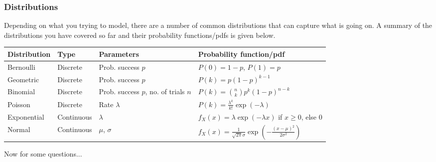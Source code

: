 \subsubsection*{Distributions}
Depending on what you trying to model, there are a number of common distributions that can capture what is going on. A summary of the distributions you have covered so far and their probability functions/pdfs is given below.

\begin{center}
    \begin{tabular}{|p{2.5cm} | p{2.5cm}| p{4cm} | p{5cm}|}
    \hline
    {\bf Distribution} & {\bf Type} & {\bf Parameters} & {\bf Probability function/pdf} \\ \hline
    Bernoulli & Discrete & Prob. success $p$ & $P(0)=1-p$, $P(1)=p$ \\ \hline
    Geometric & Discrete & Prob. success $p$ & $P(k)=p(1-p)^{k-1}$ \\ \hline
    Binomial & Discrete & Prob. success $p$, no. of trials $n$ & $P(k)=\binom{n}{k} p^{k} (1-p)^{n-k}$ \\ \hline
    Poisson & Discrete & Rate $\lambda$ & $P(k)=\frac{\lambda^{k}}{k!}\exp(-\lambda)$ \\ \hline
    Exponential & Continuous & $\lambda$ & $f_{X}(x)=\lambda\exp (-\lambda x)$ if $x\geq 0$, else 0 \\ \hline
    Normal & Continuous & $\mu$, $\sigma$ & $f_{X}(x)=\frac{1}{\sqrt{2 \pi} \sigma}\exp \left( - \frac{(x-\mu)^{2}}{2 \sigma^{2}} \right)$ \\
    \hline
    \end{tabular}
\end{center}

Now for some questions...\\
